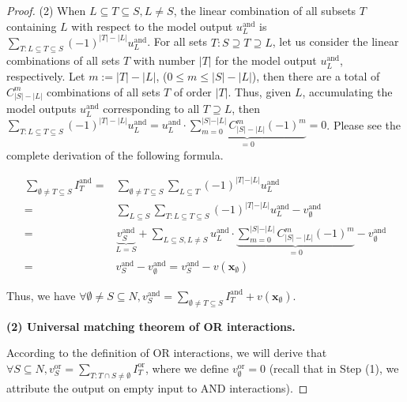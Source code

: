 \documentclass[10pt,twocolumn,letterpaper]{article}
\begin{document}
\begin{proof}
(2) When \( L\subseteq T\subseteq S, L\ne S \), the linear combination of all subsets \( T \) containing \( L \) with respect to the model output \( u^{\text{and}}_L \) is \( \sum\nolimits_{T: L \subseteq T \subseteq S} (-1)^{|T|-|L|} u^{\text{and}}_L \). For all sets \( T: S\supseteq T\supseteq L \), let us consider the linear combinations of all sets \( T \) with number \( |T| \) for the model output \( u^{\text{and}}_L \), respectively. Let \( m := |T| - |L| \), (\( 0\le m\le |S|-|L| \)), then there are a total of \( C_{|S|-|L|}^{m} \) combinations of all sets \( T \) of order \( |T| \). Thus, given \( L \), accumulating the model outputs \( u^{\text{and}}_L \) corresponding to all \( T\supseteq L \), then \( \sum\nolimits_{T: L \subseteq T \subseteq S} (-1)^{|T|-|L|} u^{\text{and}}_L = u^{\text{and}}_L \cdot \underbrace{\sum\nolimits_{m=0}^{\vert S \vert - \vert L \vert} C_{|S|-|L|}^m (-1)^m}_{=0} = 0 \). Please see the complete derivation of the following formula.

\begin{equation}\begin{aligned}
    \sum\nolimits_{\emptyset \neq T \subseteq S} I^{\text{and}}_T
    = &  \sum\nolimits_{\emptyset \neq T \subseteq S} \sum\nolimits_{L \subseteq T} (-1)^{\vert T \vert - \vert L \vert} u^{\text{and}}_L \\
    = & \sum\nolimits_{L \subseteq S} \sum\nolimits_{T: L \subseteq T \subseteq S} (-1)^{\vert T \vert - \vert L \vert} u^{\text{and}}_L  - v^{\text{and}}_\emptyset \\
    = & \underbrace{v^{\text{and}}_S}_{L = S} + \sum\nolimits_{L \subseteq S, L \neq S} u^{\text{and}}_L \cdot \underbrace{\sum\nolimits_{m=0}^{\vert S \vert - \vert L \vert} C_{|S|-|L|}^m (-1)^m}_{=0}   - v^{\text{and}}_\emptyset \\
     = & v^{\text{and}}_S  - v^{\text{and}}_\emptyset  = v^{\text{and}}_S  - v(\mathbf{x}_\emptyset)
\end{aligned}\end{equation}

Thus, we have \( \forall \emptyset \neq S\subseteq N, v^{\text{and}}_S = \sum_{\emptyset \neq T\subseteq S} I^{\text{and}}_T + v(\mathbf{x}_\emptyset) \).

\textbf{(2) Universal matching theorem of OR interactions.}

According to the definition of OR interactions, we will derive that \( \forall S\subseteq N, v^{\text{or}}_S = \sum_{T:T\cap S\neq \emptyset} I^{\text{or}}_T \),
where we define \( v^{\text{or}}_\emptyset = 0 \) (recall that in Step (1), we attribute the output on empty input to AND interactions).


\end{proof}
\end{document}
